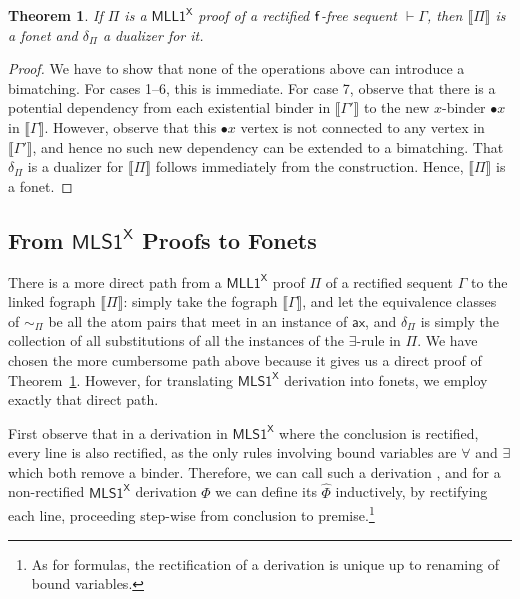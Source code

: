 \documentclass[conference,twosided,10pt]{IEEEtran}
\newtheorem{thm}{Theorem}%
\newtheorem{lemma}[thm]{Lemma}
\theoremstyle{definition}
\newcommand{\Deri}{\Phi}
\newcommand*{\FOMLL}{\mathsf{MLL1^X}}
\newcommand*{\FOMLS}{\mathsf{MLS1^X}}
\newcommand{\ax}{\mathsf{ax}}
\newcommand{\sqn}[1]{\vdash#1}
\newcommand{\single}[1]{\bullet#1}
\newcommand{\rectif}[1]{\widehat{#1}}
\newcommand{\fographof}[1]{\llbracket#1\rrbracket}
\newcommand{\graphof}[1]{\llbracket#1\rrbracket}
\newcommand{\dsubstof}[1]{\delta_{#1}}
\newcommand{\linkingof}[1]{\sim_{#1}}
\begin{document}

\begin{thm}
  \label{thm:MLL1->fonet}
  If $\Pi$ is a $\FOMLL$ proof of a rectified ${\mathsf f}$-free sequent $\sqn\Gamma$,
  then $\fographof\Pi$ is a fonet and $\dsubstof\Pi$ a dualizer for it.
\end{thm}

\begin{proof}
  We have to show that none of the operations above can introduce a
  bimatching. For cases 1--6, this is immediate. For case 7, observe
  that there is a potential dependency from each existential binder in
  $\graphof{\Gamma'}$ to the new $x$-binder $\single x$ in
  $\graphof{\Gamma}$. However, observe that this $\single x$ vertex is
  not connected to any vertex in $\graphof{\Gamma'}$, and hence no
  such new dependency can be extended to a bimatching. That
  $\dsubstof\Pi$ is a dualizer for $\fographof\Pi$ follows immediately
  from the construction. Hence,  $\fographof\Pi$ is a fonet.
\end{proof}

\subsection{From $\FOMLS$ Proofs to Fonets}

There is a more direct path from a $\FOMLL$ proof $\Pi$ of a rectified
sequent $\Gamma$ to the linked fograph $\fographof\Pi$: simply take
the fograph $\graphof\Gamma$, and let the equivalence classes of
$\linkingof\Pi$ be all the atom pairs that meet in an instance of
$\ax$, and $\dsubstof\Pi$ is simply the collection of all substitutions
of all the instances of the $\exists$-rule in $\Pi$.
%
We have chosen the more cumbersome path above because it gives us a
direct proof of Theorem~\ref{thm:MLL1->fonet}.
%
However, for translating $\FOMLS$ derivation into fonets, we employ
exactly that direct path.

First observe that in a derivation in $\FOMLS$
where the conclusion is rectified, every line is also rectified, as
the only rules involving bound variables are $\forall$ and $\exists$
which both remove a binder.
Therefore, we can call such a derivation , and
%
%
%
for a non-rectified  $\FOMLS$ derivation $\Deri$ we can
define its  $\rectif\Deri$ inductively, by rectifying each
line, proceeding step-wise
from conclusion to premise.\footnote{As for formulas,
the rectification of a derivation is unique up to renaming of bound
variables.}
\end{document}
